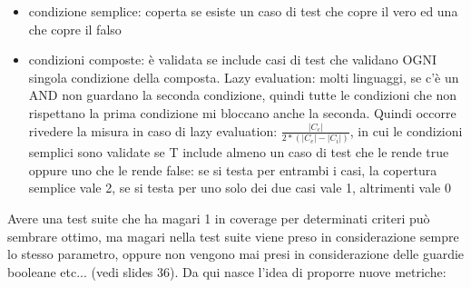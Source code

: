 \documentclass{article}
\begin{document}
\begin{itemize}
\begin{itemize}
\item condizione semplice: coperta se esiste un caso di test che copre il vero ed una che copre il falso
\item condizioni composte: è validata se include casi di test che validano OGNI singola condizione della composta. Lazy evaluation: molti linguaggi, se c'è un AND non guardano la seconda condizione, quindi tutte le condizioni che non rispettano la prima condizione mi bloccano anche la seconda. Quindi occorre rivedere la misura in caso di lazy evaluation: $\frac{|C_c|}{2*(|C_e| - |C_i|)}$, in cui le condizioni semplici sono validate se T include almeno un caso di test che le rende true oppure uno che le rende false: se si testa per entrambi i casi, la copertura semplice vale 2, se si testa per uno solo dei due casi vale 1, altrimenti vale 0
\end{itemize}
\end{itemize}
Avere una test suite che ha magari 1 in coverage per determinati criteri può sembrare ottimo, ma magari nella test suite viene preso in considerazione sempre lo stesso parametro, oppure non vengono mai presi in considerazione delle guardie booleane etc... (vedi slides 36). Da qui nasce l'idea di proporre nuove metriche: 
\end{document}
